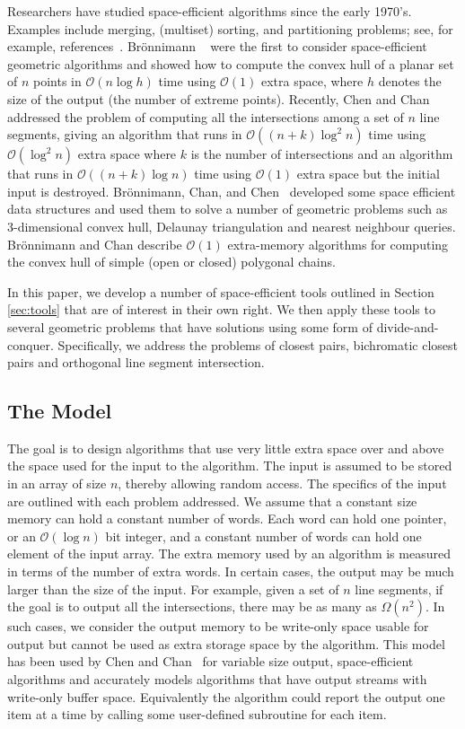 \documentclass{elsart}
\newcommand{\Oh}[1]{\ensuremath{\mathcal{O}(#1)}}
\newcommand{\Wm}[1]{\ensuremath{\Omega(#1)}}
\begin{document}
Researchers have studied space-efficient algorithms since the early
1970's. Examples include merging, (multiset) sorting, and partitioning
problems; see, for example,
references~\cite{geffert:merging,katajainen:partitioning,katajainen:multisets}.
Br\"onnimann \etal~\cite{bronnimann:convex} were the first to consider
space-efficient geometric algorithms and showed how to compute the
convex hull of a planar set of $n$ points in \Oh{n \log h} time using
\Oh{1} extra space, where $h$ denotes the size of the output (the
number of extreme points).  Recently, Chen and
Chan~\cite{chen:space-efficient} addressed the problem of computing
all the intersections among a set of $n$ line segments, giving an
algorithm that runs in \Oh{(n+k)\log^2 n} time using \Oh{\log^2n}
extra space where $k$ is the number of intersections and an algorithm
that runs in \Oh{(n+k)\log n} time using \Oh{1} extra space but the
initial input is destroyed.  Br\"onnimann, Chan, and
Chen~\cite{bronnimann:inplace} developed some space efficient data
structures and used them to solve a number of geometric problems such
as 3-dimensional convex hull, Delaunay triangulation and nearest
neighbour queries.  Br\"onnimann and Chan \cite{bronnimann:melkman}
describe $\Oh{1}$ extra-memory algorithms for computing the convex
hull of simple (open or closed) polygonal chains. 

In this paper, we develop a number of space-efficient tools outlined
in Section \ref{sec:tools} that are of interest in their own right. We
then apply these tools to several geometric problems that have
solutions using some form of divide-and-conquer. Specifically, we
address the problems of closest pairs, bichromatic closest pairs and
orthogonal line segment intersection.

\subsection{The Model}

The goal is to design algorithms that use very little extra space over
and above the space used for the input to the algorithm. The input is
assumed to be stored in an array of size $n$, thereby allowing random
access.  The specifics of the input are outlined with each problem
addressed.  We assume that a constant size memory can hold a constant
number of words. Each word can hold one pointer, or an \Oh{\log n} bit
integer, and a constant number of words can hold one element of the
input array. The extra memory used by an algorithm is measured in
terms of the number of extra words. In certain cases, the output may
be much larger than the size of the input. For example, given a set of
$n$ line segments, if the goal is to output all the intersections,
there may be as many as \Wm{n^2}. In such cases, we consider the
output memory to be write-only space usable for output but cannot be
used as extra storage space by the algorithm.  This model has been
used by Chen and Chan~\cite{chen:space-efficient} for variable size
output, space-efficient algorithms and accurately models algorithms
that have output streams with write-only buffer space. Equivalently
the algorithm could report the output one item at a time by calling
some user-defined subroutine for each item.
\end{document}
